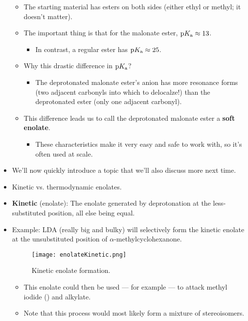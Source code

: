 \documentclass[../notes.tex]{subfiles}
\begin{document}
\begin{itemize}
\begin{itemize}
        \item The starting material has esters on both sides (either ethyl or methyl; it doesn't matter).
        \item The important thing is that for the malonate ester, $\textup{p}K_\textup{a}\approx 13$.
        \begin{itemize}
            \item In contrast, a regular ester has $\textup{p}K_\textup{a}\approx 25$.
        \end{itemize}
        \item Why this drastic difference in $\textup{p}K_\textup{a}$?
        \begin{itemize}
            \item The deprotonated malonate ester's anion has more resonance forms (two adjacent carbonyls into which to delocalze!) than the deprotonated ester (only one adjacent carbonyl).
        \end{itemize}
        \item This difference leads us to call the deprotonated malonate ester a \textbf{soft enolate}.
        \begin{itemize}
            \item These characteristics make it very easy and safe to work with, so it's often used at scale.
        \end{itemize}
    \end{itemize}
    \item We'll now quickly introduce a topic that we'll also discuss more next time.
    \item Kinetic vs. thermodynamic enolates.
    \item \textbf{Kinetic} (enolate): The enolate generated by deprotonation at the less-substituted position, all else being equal.
    \item Example: LDA (really big and bulky) will selectively form the kinetic enolate at the unsubstituted position of $\alpha$-methylcyclohexanone.
    \begin{figure}[h!]
        \centering
        \texttt{[image: enolateKinetic.png]}
        \caption{Kinetic enolate formation.}
        \label{fig:enolateKinetic}
    \end{figure}
    \begin{itemize}
        \item This enolate could then be used --- for example --- to attack methyl iodide () and alkylate.
        \item Note that this process would most likely form a mixture of stereoisomers.

\end{itemize}
\end{itemize}
\end{document}
